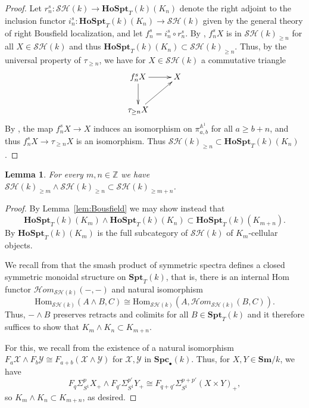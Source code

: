 \documentclass[a4paper,12pt,draft]{amsart}
\newtheorem{lemma}{Lemma}
\theoremstyle{definition}
\theoremstyle{remark}
\begin{document}
\begin{proof}Let $r_n^s:{\mathcal{SH}}(k)\to {{\mathbf{Ho}}}{{\mathbf{Spt}}}_T(k)(K_n)$ denote the right adjoint to the inclusion functor $i_n^s:{{\mathbf{Ho}}}{{\mathbf{Spt}}}_T(k)(K_n)\to {\mathcal{SH}}(k)$ given by the general theory of right Bousfield localization, and let $f_n^s=i_n^s\circ r_n^s$. By \cite[lemma 4.5]{Lev13b}, $f_n^sX$ is in ${\mathcal{SH}}(k)_{\ge n}$ for all $X\in {\mathcal{SH}}(k)$ and thus ${{\mathbf{Ho}}}{{\mathbf{Spt}}}_T(k)(K_n)\subset {\mathcal{SH}}(k)_{\ge n}$.  Thus, by the universal property of $\tau_{\ge n}$, we  have for $X\in {\mathcal{SH}}(k)$  a commutative triangle
\[
\xymatrix{
f_n^sX\ar[r]\ar[d]&X\\
\tau_{\ge n}X\ar[ur]
}
\]
By \cite[lemma 4.3]{Lev13b}, the map $f_n^sX\to X$ induces an isomorphism on $\pi^{{{\mathbb A}}^1}_{a,b}$ for all $a\ge b+n$, and thus $f_n^sX\to \tau_{\ge n}X$ is an isomorphism. Thus ${\mathcal{SH}}(k)_{\ge n}\subset {{\mathbf{Ho}}}{{\mathbf{Spt}}}_T(k)(K_n)$.
\end{proof}

\begin{lemma}\label{lem:smash}
For every $m,n\in {{\mathbb Z}}$ we have $ {\mathcal{SH}}(k)_{\ge m}\wedge {\mathcal{SH}}(k)_{\ge n}  \subset  {\mathcal{SH}}(k)_{\ge m+n}$.
\end{lemma}
\begin{proof}   By Lemma~\ref{lem:Bousfield} we may show instead that  
\[
{{\mathbf{Ho}}}{{\mathbf{Spt}}}_T(k)(K_m)\wedge {{\mathbf{Ho}}}{{\mathbf{Spt}}}_T(k)(K_n)\subset 
{{\mathbf{Ho}}}{{\mathbf{Spt}}}_T(k)(K_{m+n}). 
\]
By \cite[theorem 2.4]{Lev13b} ${{\mathbf{Ho}}}{{\mathbf{Spt}}}_T(k)(K_m)$ is the full subcategory of ${\mathcal{SH}}(k)$ of $K_m$-cellular objects. 

We recall from \cite[\S 4.3]{Jardine00} that  the smash product of symmetric spectra defines a closed symmetric monoidal structure on ${{\mathbf{Spt}}}_T(k)$, that is, there is an internal Hom functor ${{\mathcal{H}{om}}}_{{\mathcal{SH}}(k)}(-,-)$ and natural isomorphism
\[
{\text{Hom}}_{{\mathcal{SH}}(k)}(A\wedge B, C)\cong {\text{Hom}}_{{\mathcal{SH}}(k)}(A, {{\mathcal{H}{om}}}_{{\mathcal{SH}}(k)}(B, C)).
\]
Thus,  $-\wedge B$ preserves  retracts and  colimits for all $B\in {{\mathbf{Spt}}}_T(k)$ and it therefore suffices to show that  $K_m\wedge K_n\subset K_{m+n}$.  

For this,  we recall from \cite[Corollary 4.18]{Jardine00} the existence of a natural isomorphism  $F_a{{\mathcal X}}\wedge F_b{{\mathcal Y}}\cong F_{a+b}({{\mathcal X}}\wedge {{\mathcal Y}})$ for ${{\mathcal X}}, {{\mathcal Y}}$ in ${{\mathbf{Spc}}}_\bullet(k)$. Thus, for $X, Y\in {{\mathbf{Sm}}}/k$, we have 
\[
F_q\Sigma^p_{S^1}X_+\wedge F_{q'}\Sigma^{p'}_{S^1}Y_+\cong
F_{q+q'}\Sigma^{p+p'}_{S^1} (X\times Y)_+,
\]
so $K_m\wedge K_n\subset K_{m+n}$, as desired.
\end{proof}
\end{document}
